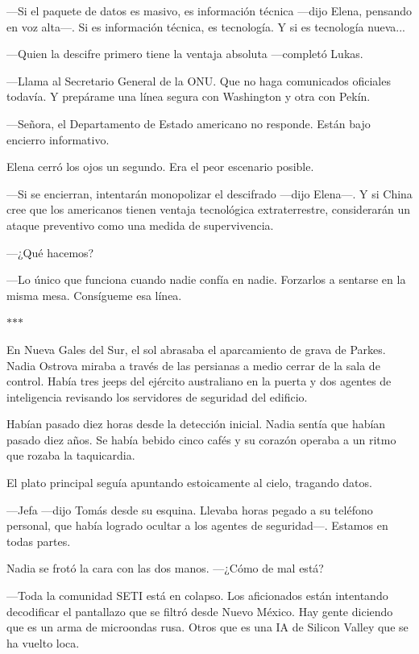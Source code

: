 \documentclass[11pt,a5paper,twoside]{book}
\begin{document}
—Si el paquete de datos es masivo, es información técnica —dijo Elena, pensando en voz alta—. Si es información técnica, es tecnología. Y si es tecnología nueva...

—Quien la descifre primero tiene la ventaja absoluta —completó Lukas.

—Llama al Secretario General de la ONU. Que no haga comunicados oficiales todavía. Y prepárame una línea segura con Washington y otra con Pekín.

—Señora, el Departamento de Estado americano no responde. Están bajo encierro informativo.

Elena cerró los ojos un segundo. Era el peor escenario posible.

—Si se encierran, intentarán monopolizar el descifrado —dijo Elena—. Y si China cree que los americanos tienen ventaja tecnológica extraterrestre, considerarán un ataque preventivo como una medida de supervivencia.

—¿Qué hacemos?

—Lo único que funciona cuando nadie confía en nadie. Forzarlos a sentarse en la misma mesa. Consígueme esa línea.

\vspace{1.5em}
\begin{center}$\ast$\quad$\ast$\quad$\ast$\end{center}
\vspace{1.5em}

En Nueva Gales del Sur, el sol abrasaba el aparcamiento de grava de Parkes. Nadia Ostrova miraba a través de las persianas a medio cerrar de la sala de control. Había tres jeeps del ejército australiano en la puerta y dos agentes de inteligencia revisando los servidores de seguridad del edificio.

Habían pasado diez horas desde la detección inicial. Nadia sentía que habían pasado diez años. Se había bebido cinco cafés y su corazón operaba a un ritmo que rozaba la taquicardia.

El plato principal seguía apuntando estoicamente al cielo, tragando datos.

—Jefa —dijo Tomás desde su esquina. Llevaba horas pegado a su teléfono personal, que había logrado ocultar a los agentes de seguridad—. Estamos en todas partes.

Nadia se frotó la cara con las dos manos. —¿Cómo de mal está?

—Toda la comunidad SETI está en colapso. Los aficionados están intentando decodificar el pantallazo que se filtró desde Nuevo México. Hay gente diciendo que es un arma de microondas rusa. Otros que es una IA de Silicon Valley que se ha vuelto loca.
\end{document}
